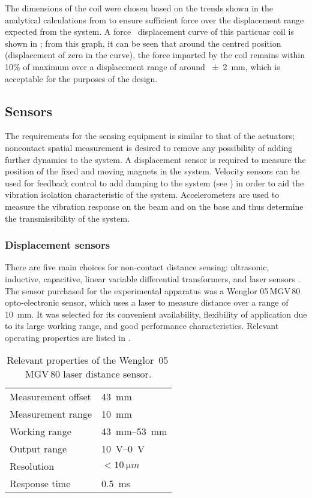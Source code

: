 \documentclass[11pt,a4paper]{memoir}
\begin{document}
The dimensions of the coil were chosen based on the trends shown in the
analytical calculations from  to ensure sufficient force over the displacement range expected from the system.
A force \vs\  displacement curve of this particuar coil is shown in ; from this
graph, it can be seen that around the centred position (displacement of zero
in the curve), the force imparted by the coil remains within 10\% of maximum
over a displacement range of around \SI{\pm2}{mm}, which is acceptable for the purposes of the design.

\subsection{Sensors}

The requirements for the sensing equipment is similar to that of the actuators; noncontact spatial measurement is desired to remove any possibility of adding further dynamics to the system.
A displacement sensor is required to measure the position of the fixed and moving magnets in the system.
Velocity sensors can be used for feedback control to add damping to the system (see ) in order to aid the vibration isolation characteristic of the system.
Accelerometers are used to measure the vibration response on the beam and on the base and thus determine the transmissibility of the system.

\subsubsection{Displacement sensors}

There are five main choices for non-contact distance sensing: ultrasonic, inductive, capacitive, linear variable differential transformers, and laser sensors \cite{boehm1993}.
The sensor purchased for the experimental apparatus was a Wenglor 05\,MGV\,80
opto-electronic sensor, which uses a laser to measure distance over a
range of \SI{10}{mm}. It was selected for its convenient availability,
flexibility of application due to its large working range, and good performance characteristics.
Relevant operating properties are listed in .

\begin{table}
  \caption{Relevant properties of the Wenglor~05\,MGV\,80 laser distance sensor.}
  \begin{tabular}{@{}ll@{}}
    \toprule
    Measurement offset & \SI{43}{mm} \\
    Measurement range & \SI{10}{mm} \\
    \midrule
    Working range & \SI{43}{mm}--\SI{53}{mm} \\
    Output range & \SI{10}{V}--\SI{0}{V} \\
    \midrule
    Resolution & $<\SI{10}{\micro m}$ \\
    Response time & \SI{0.5}{ms} \\
    \bottomrule
  \end{tabular}
\end{table}
\end{document}
